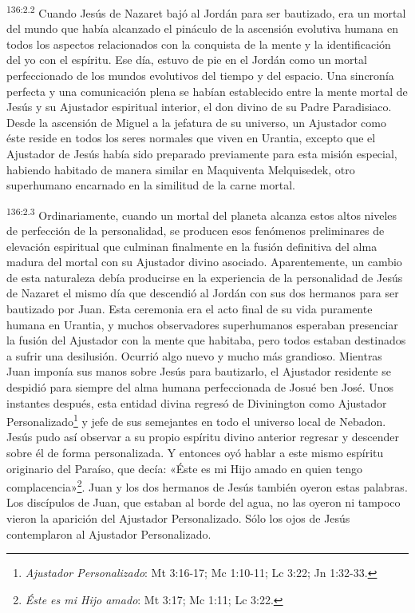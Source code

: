 \par 
\textsuperscript{136:2.2} Cuando Jesús de Nazaret bajó al Jordán para ser bautizado, era un mortal del mundo que había alcanzado el pináculo de la ascensión evolutiva humana en todos los aspectos relacionados con la conquista de la mente y la identificación del yo con el espíritu. Ese día, estuvo de pie en el Jordán como un mortal perfeccionado de los mundos evolutivos del tiempo y del espacio. Una sincronía perfecta y una comunicación plena se habían establecido entre la mente mortal de Jesús y su Ajustador espiritual interior, el don divino de su Padre Paradisiaco. Desde la ascensión de Miguel a la jefatura de su universo, un Ajustador como éste reside en todos los seres normales que viven en Urantia, excepto que el Ajustador de Jesús había sido preparado previamente para esta misión especial, habiendo habitado de manera similar en Maquiventa Melquisedek, otro superhumano encarnado en la similitud de la carne mortal.

\par 
\textsuperscript{136:2.3} Ordinariamente, cuando un mortal del planeta alcanza estos altos niveles de perfección de la personalidad, se producen esos fenómenos preliminares de elevación espiritual que culminan finalmente en la fusión definitiva del alma madura del mortal con su Ajustador divino asociado. Aparentemente, un cambio de esta naturaleza debía producirse en la experiencia de la personalidad de Jesús de Nazaret el mismo día que descendió al Jordán con sus dos hermanos para ser bautizado por Juan. Esta ceremonia era el acto final de su vida puramente humana en Urantia, y muchos observadores superhumanos esperaban presenciar la fusión del Ajustador con la mente que habitaba, pero todos estaban destinados a sufrir una desilusión. Ocurrió algo nuevo y mucho más grandioso. Mientras Juan imponía sus manos sobre Jesús para bautizarlo, el Ajustador residente se despidió para siempre del alma humana perfeccionada de Josué ben José. Unos instantes después, esta entidad divina regresó de Divinington como Ajustador Personalizado\footnote{\textit{Ajustador Personalizado}: Mt 3:16-17; Mc 1:10-11; Lc 3:22; Jn 1:32-33.} y jefe de sus semejantes en todo el universo local de Nebadon. Jesús pudo así observar a su propio espíritu divino anterior regresar y descender sobre él de forma personalizada. Y entonces oyó hablar a este mismo espíritu originario del Paraíso, que decía: «Éste es mi Hijo amado en quien tengo complacencia»\footnote{\textit{Éste es mi Hijo amado}: Mt 3:17; Mc 1:11; Lc 3:22.}. Juan y los dos hermanos de Jesús también oyeron estas palabras. Los discípulos de Juan, que estaban al borde del agua, no las oyeron ni tampoco vieron la aparición del Ajustador Personalizado. Sólo los ojos de Jesús contemplaron al Ajustador Personalizado.

